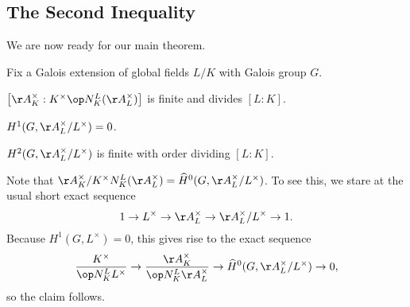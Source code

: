 \documentclass[../notes.tex]{subfiles}
\begin{document}
\subsection{The Second Inequality}
We are now ready for our main theorem.
\begin{theorem}
	Fix a Galois extension of global fields $L/K$ with Galois group $G$.
	\begin{listalph}
		\item $\left[\AA_K^\times:K^\times\op N^L_K(\AA_L^\times)\right]$ is finite and divides $[L:K]$.
		\item $H^1(G,\AA_L^\times/L^\times)=0$.
		\item $H^2(G,\AA_L^\times/L^\times)$ is finite with order dividing $[L:K]$.
	\end{listalph}
\end{theorem}
\begin{remark}
	Note that $\AA_K^\times/K^\times N^L_K(\AA_L^\times)=\widehat H^0(G,\AA_L^\times/L^\times)$. To see this, we stare at the usual short exact sequence
	\[1\to L^\times\to\AA_L^\times\to\AA_L^\times/L^\times\to1.\]
	Because $H^1(G,L^\times)=0$, this gives rise to the exact sequence
	\[\frac{K^\times}{\op N^L_KL^\times}\to\frac{\AA_K^\times}{\op N^L_K\AA_L^\times}\to\widehat H^0(G,\AA_L^\times/L^\times)\to0,\]
	so the claim follows.
\end{remark}
\end{document}
